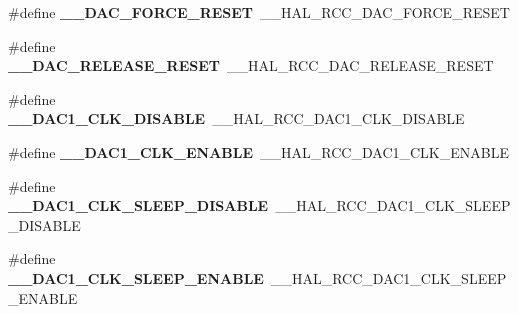 \begin{DoxyCompactItemize}
\item 
\hypertarget{group___h_a_l___r_c_c___aliased_ga3ad903bd351d3f99ebbc3a9cadec68e2}{\#define {\bfseries \-\_\-\-\_\-\-D\-A\-C\-\_\-\-F\-O\-R\-C\-E\-\_\-\-R\-E\-S\-E\-T}~\-\_\-\-\_\-\-H\-A\-L\-\_\-\-R\-C\-C\-\_\-\-D\-A\-C\-\_\-\-F\-O\-R\-C\-E\-\_\-\-R\-E\-S\-E\-T}\label{group___h_a_l___r_c_c___aliased_ga3ad903bd351d3f99ebbc3a9cadec68e2}

\item 
\hypertarget{group___h_a_l___r_c_c___aliased_ga27ea810f1968458f867faa45bb70bbe7}{\#define {\bfseries \-\_\-\-\_\-\-D\-A\-C\-\_\-\-R\-E\-L\-E\-A\-S\-E\-\_\-\-R\-E\-S\-E\-T}~\-\_\-\-\_\-\-H\-A\-L\-\_\-\-R\-C\-C\-\_\-\-D\-A\-C\-\_\-\-R\-E\-L\-E\-A\-S\-E\-\_\-\-R\-E\-S\-E\-T}\label{group___h_a_l___r_c_c___aliased_ga27ea810f1968458f867faa45bb70bbe7}

\item 
\hypertarget{group___h_a_l___r_c_c___aliased_ga7c25ff5fcaf15c3c3667584c18c4b8b7}{\#define {\bfseries \-\_\-\-\_\-\-D\-A\-C1\-\_\-\-C\-L\-K\-\_\-\-D\-I\-S\-A\-B\-L\-E}~\-\_\-\-\_\-\-H\-A\-L\-\_\-\-R\-C\-C\-\_\-\-D\-A\-C1\-\_\-\-C\-L\-K\-\_\-\-D\-I\-S\-A\-B\-L\-E}\label{group___h_a_l___r_c_c___aliased_ga7c25ff5fcaf15c3c3667584c18c4b8b7}

\item 
\hypertarget{group___h_a_l___r_c_c___aliased_gabd1fb5dfac0255c80e1a18dc3a536006}{\#define {\bfseries \-\_\-\-\_\-\-D\-A\-C1\-\_\-\-C\-L\-K\-\_\-\-E\-N\-A\-B\-L\-E}~\-\_\-\-\_\-\-H\-A\-L\-\_\-\-R\-C\-C\-\_\-\-D\-A\-C1\-\_\-\-C\-L\-K\-\_\-\-E\-N\-A\-B\-L\-E}\label{group___h_a_l___r_c_c___aliased_gabd1fb5dfac0255c80e1a18dc3a536006}

\item 
\hypertarget{group___h_a_l___r_c_c___aliased_ga475e99075ae36a0f7018cd5183a3bb17}{\#define {\bfseries \-\_\-\-\_\-\-D\-A\-C1\-\_\-\-C\-L\-K\-\_\-\-S\-L\-E\-E\-P\-\_\-\-D\-I\-S\-A\-B\-L\-E}~\-\_\-\-\_\-\-H\-A\-L\-\_\-\-R\-C\-C\-\_\-\-D\-A\-C1\-\_\-\-C\-L\-K\-\_\-\-S\-L\-E\-E\-P\-\_\-\-D\-I\-S\-A\-B\-L\-E}\label{group___h_a_l___r_c_c___aliased_ga475e99075ae36a0f7018cd5183a3bb17}

\item 
\hypertarget{group___h_a_l___r_c_c___aliased_ga26e27afc0dbb8047108c4d858cc1f9c1}{\#define {\bfseries \-\_\-\-\_\-\-D\-A\-C1\-\_\-\-C\-L\-K\-\_\-\-S\-L\-E\-E\-P\-\_\-\-E\-N\-A\-B\-L\-E}~\-\_\-\-\_\-\-H\-A\-L\-\_\-\-R\-C\-C\-\_\-\-D\-A\-C1\-\_\-\-C\-L\-K\-\_\-\-S\-L\-E\-E\-P\-\_\-\-E\-N\-A\-B\-L\-E}\label{group___h_a_l___r_c_c___aliased_ga26e27afc0dbb8047108c4d858cc1f9c1}


\end{DoxyCompactItemize}
